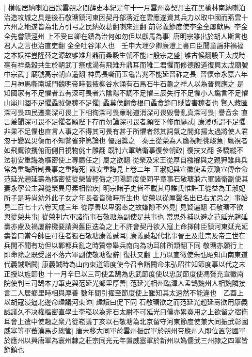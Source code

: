 |{
	横帳居納喇泊出寇雲朔之間薛史本紀是年十一月雲州奏契丹主在黑榆林南納喇泊治造攻城之具是後石敬瑭鎮河東因契丹部落近在雲應遂資其兵力以取中國而燕雲十六州之地遂皆為北方引弓之民納奴葛翻喇來達翻}
前彰義節度使李金全屢獻馬|{
	李金全先嘗鎮涇州}
上不受曰卿在鎮為治何如勿但以獻馬為事|{
	唐明宗雖出於胡人斯言也君人之言也治直吏翻}
金全吐谷渾人也　壬申大理少卿康澄上書曰臣聞童謡非禍福之本妖祥豈隆替之源故雊雉升鼎而桑榖生朝不能止殷宗之盛|{
	雊古候翻殷王太戊時亳有祥桑榖共生於朝武丁祭成湯有飛雉升鼎耳而雊二君懼而修德殷道復興太戊廟號中宗武丁廟號高宗朝直遥翻}
神馬長嘶而玉龜告兆不能延晉祚之長|{
	晉懷帝永嘉六年二月神馬嘶南城門魏明帝時張掖柳谷水涌有石馬石牛石龜之祥人以為晉興應之}
是知國家有不足懼者五有深可畏者六隂陽不調不足懼三辰失行不足懼小人譌言不足懼山崩川涸不足懼蟊賊傷稼不足懼|{
	蟊莫侯翻食根曰蟊食節曰賊皆害稼者也}
賢人藏匿深可畏四民遷業深可畏上下相徇深可畏亷恥道消深可畏毁譽亂真深可畏|{
	譽音余}
直言蔑聞深可畏不足懼者願陛下存而勿論深可畏者願陛下修而靡忒|{
	康澄所謂不足懼非果不足懼也直言人事之不得其可畏有甚于所懼者然其詞氣之間抑揚太過將使人君忽于變異災傷而不知警省非篤論也}
優詔奬之　秦王從榮為人鷹視輕佻峻急|{
	鷹視者如飛鷹欲攫俯而側目視物佻土雕翻}
既判六軍諸衛事復參朝政|{
	復扶又翻}
多驕縱不法初安重誨為樞密使上專屬任之|{
	屬之欲翻}
從榮及宋王從厚自襁褓與之親狎雖典兵常為重誨所制畏事之重誨死|{
	誅安重誨見上卷二年}
王淑妃與宣徽使孟漢瓊宣傳帝命范延光趙延壽為樞密使從榮皆輕侮之河陽節度使同平章事石敬瑭兼六軍諸衛副使其妻永寧公主與從榮異母素相憎疾|{
	明宗諸子史皆不載其母誰氏惟許王從益為王淑妃所子是時尚幼外此子女之年長者皆微時所生也}
從榮以從厚聲名出已右尤忌之|{
	事始見二百七十六卷天成三年}
從厚善以卑弱奉之故嫌隙不外見|{
	見賢遍翻}
石敬瑭不欲與從榮共事|{
	從榮判六軍諸衛事石敬瑭為副使是共事也}
常思外補以避之范延光趙延壽亦慮及禍屢辭機要請與舊臣迭為之上不許會契丹欲入寇上命擇帥臣鎮河東延光延壽皆曰當今帥臣可往者獨石敬瑭康義誠耳|{
	康義誠起代北事晉王及莊宗及帝三世在兵間不聞有功但以鄴都兵亂之時贊帝舉兵南向為功耳帥所類翻下同}
敬瑭亦願行上即命除之既受詔不落六軍副使敬瑭復辭|{
	復扶又翻}
上乃以宣徽使朱弘昭知山南東道代義誠詣闕|{
	康義誠時為山南東道節度使今召令詣闕命朱弘昭往知節度事以代之未正授以旌節也}
十一月辛巳以三司使孟鵠為忠武節度使以忠武節度使馮贇充宣徽南院使判三司鵠本刀筆吏與范延光鄉里厚善|{
	范延光相州臨漳人孟鵠魏州人相魏隣接言二人居鄉里時相與厚善}
數年間引擢至節度使上雖知其太速然不能違也　乙酉上以胡寇浸逼北邊命趣議河東帥|{
	趣讀曰促下同}
石敬瑭欲之而范延光趙延壽欲用康義誠議久不决權樞密直學士李崧以為非石太尉不可延光曰僕亦累奏用之上欲留之宿衛耳會上遣中使趣之衆乃從崧議丁亥以石敬瑭為北京留守河東節度使兼大同振武彰國威塞等軍蕃漢馬步總管|{
	唐末移大同軍於雲州振武軍於朔州帝應州人即位置彰國軍於應州以興唐軍為寰州隸之莊宗同光元年置威塞軍於新州以媯儒武三州隸之四軍皆節鎮也}
